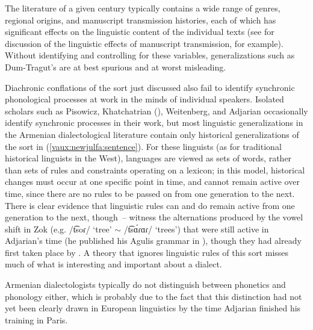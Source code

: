 \documentclass[output=paper]{langscibook}
\begin{document}
The literature of a given century typically contains a wide range of genres, regional origins, and manuscript transmission histories, each of which has significant effects on the linguistic content of the individual texts (see \citealt{Coulie-2014-TextEditingArmenianPhilology} for discussion of the linguistic effects of manuscript transmission, for example). Without identifying and controlling for these variables,  generalizations such as Dum-Tragut's are at best spurious and at worst misleading.

Diachronic conflations of the sort just discussed also fail to identify synchronic phonological processes at work in the minds of individual speakers. Isolated scholars such as Pisowicz,   Khatchatrian (), Weitenberg, and Adjarian occasionally identify synchronic processes in their work, but most linguistic generalizations in the Armenian dialectological literature contain only historical generalizations of the sort in (\ref{vaux:newjulfa:sentence}). For these linguists (as for traditional historical linguists in the West), languages are viewed as sets of words, rather than sets of rules and constraints operating on a lexicon; in this model, historical changes must occur at one specific point in time, and cannot remain active over time, since there are no rules to be passed on from one generation to the next. There is clear evidence that linguistic rules can and do remain active from one generation to the next, though~– witness the alternations produced by the vowel shift in Zok (e.g. /t͡soɾ/ `tree' $\sim$ /t͡sɑ́ɾɑɾ/ `trees') that were still active in Adjarian's time (he published his Agulis grammar in \citeyear{Adjarian-1935-AgulisDialect}), though they had already first taken place by \citet{Shroder-1711-TheasauresArmenian}. A theory that ignores linguistic rules of this sort misses much of what is interesting and important about a dialect.

Armenian dialectologists typically do not distinguish between phonetics and phonology either, which is probably due to the fact that this distinction had not yet been clearly drawn in European linguistics by the time Adjarian finished his training in Paris.

 
\end{document}
